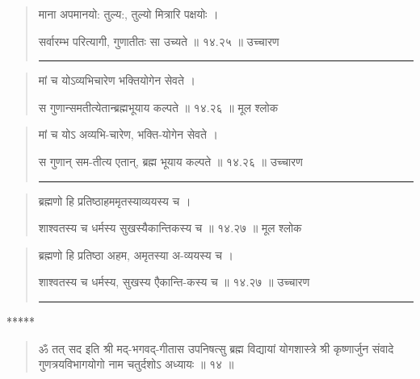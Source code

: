 \begin{quotation}

माना अपमानयो: तुल्य:, तुल्यो मित्रारि पक्षयोः  ।  

सर्वारम्भ परित्यागी, गुणातीतः सा उच्यते  ॥ १४.२५ ॥  उच्चारण

\noindent\rule{16cm}{0.4pt} 
\end{quotation}


\begin{quotation}

मां च योऽव्यभिचारेण भक्तियोगेन सेवते  ।  

स गुणान्समतीत्येतान्ब्रह्मभूयाय कल्पते  ॥ १४.२६ ॥  मूल श्लोक
\end{quotation}

\begin{quotation}

मां च योऽ अव्यभि-चारेण, भक्ति-योगेन सेवते  ।  

स गुणान् सम-तीत्य एतान्, ब्रह्म भूयाय कल्पते  ॥  १४.२६ ॥  उच्चारण

\noindent\rule{16cm}{0.4pt} 
\end{quotation}


\begin{quotation}

ब्रह्मणो हि प्रतिष्ठाहममृतस्याव्ययस्य च  ।  

शाश्वतस्य च धर्मस्य सुखस्यैकान्तिकस्य च  ॥ १४.२७ ॥  मूल श्लोक
\end{quotation}

\begin{quotation}

ब्रह्मणो हि प्रतिष्ठा अहम, अमृतस्या अ-व्ययस्य च  ।  

शाश्वतस्य च धर्मस्य, सुखस्य एैकान्ति-कस्य च  ॥ १४.२७ ॥  उच्चारण

\noindent\rule{16cm}{0.4pt} 
\end{quotation}
\begin{center} ***** \end{center}


\begin{quotation}

ॐ तत् सद इति श्री मद्-भगवद्-गीतास उपनिषत्सु ब्रह्म विद्यायां योगशास्त्रे श्री कृष्णार्जुन संवादे गुणत्रयविभागयोगो नाम चतुर्दशोऽ अध्यायः  ॥  १४  ॥ 

\end{quotation}
